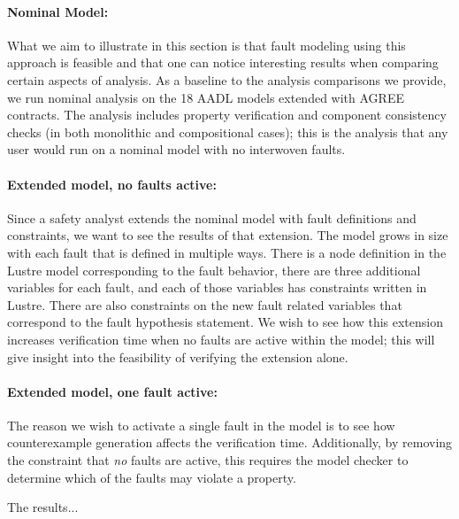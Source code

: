 \paragraph{Nominal Model: }What we aim to illustrate in this section is that fault modeling using this approach is feasible and that one can notice interesting results when comparing certain aspects of analysis. As a baseline to the analysis comparisons we provide, we run nominal analysis on the 18 AADL models extended with AGREE contracts. The analysis includes property verification and component consistency checks (in both monolithic and compositional cases); this is the analysis that any user would run on a nominal model with no interwoven faults. 

\paragraph{Extended model, no faults active:} Since a safety analyst extends the nominal model with fault definitions and constraints, we want to see the results of that extension. The model grows in size with each fault that is defined in multiple ways. There is a node definition in the Lustre model corresponding to the fault behavior, there are three additional variables for each fault, and each of those variables has constraints written in Lustre. There are also constraints on the new fault related variables that correspond to the fault hypothesis statement. We wish to see how this extension increases verification time when no faults are active within the model; this will give insight into the feasibility of verifying the extension alone. 

\paragraph{Extended model, one fault active:} The reason we wish to activate a single fault in the model is to see how counterexample generation affects the verification time. Additionally, by removing the constraint that {\em no} faults are active, this requires the model checker to determine which of the faults may violate a property. 


The results... 


